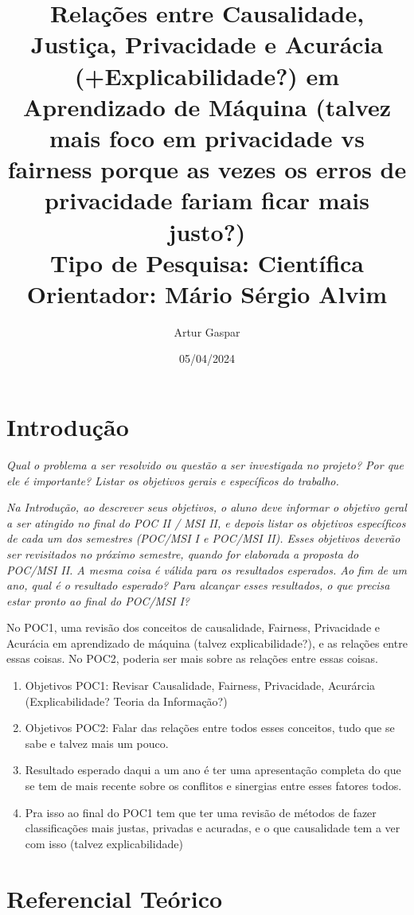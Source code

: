 \documentclass{article}
\title{Relações entre Causalidade, Justiça, Privacidade e Acurácia (+Explicabilidade?) em Aprendizado de Máquina (talvez mais foco em privacidade vs fairness porque as vezes os erros de privacidade fariam ficar mais justo?)\large\\ Tipo de Pesquisa: Científica\\Orientador: Mário Sérgio Alvim}
\author{Artur Gaspar}
\date{05/04/2024}
\begin{document}
\maketitle

\section{Introdução}

\textit{Qual o problema a ser resolvido ou questão a ser investigada no projeto? Por que ele é importante? Listar os objetivos gerais e específicos do trabalho.}

\textit{Na Introdução, ao descrever seus objetivos, o aluno deve informar o objetivo geral a ser atingido no final do POC II / MSI II, e depois listar os objetivos específicos de cada um dos semestres (POC/MSI I e POC/MSI II). Esses objetivos deverão ser revisitados no próximo semestre, quando for elaborada a proposta do POC/MSI II. A mesma coisa é válida para os resultados esperados. Ao fim de um ano, qual é o resultado esperado? Para alcançar esses resultados, o que precisa estar pronto ao final do POC/MSI I?}

No POC1, uma revisão dos conceitos de causalidade, Fairness, Privacidade e Acurácia em aprendizado de máquina (talvez explicabilidade?), e as relações entre essas coisas. No POC2, poderia ser mais sobre as relações entre essas coisas.

\begin{enumerate}
    \item Objetivos POC1: Revisar Causalidade, Fairness, Privacidade, Acurárcia (Explicabilidade? Teoria da Informação?)
    \item Objetivos POC2: Falar das relações entre todos esses conceitos, tudo que se sabe e talvez mais um pouco.
    \item Resultado esperado daqui a um ano é ter uma apresentação completa do que se tem de mais recente sobre os conflitos e sinergias entre esses fatores todos.
    \item Pra isso ao final do POC1 tem que ter uma revisão de métodos de fazer classificações mais justas, privadas e acuradas, e o que causalidade tem a ver com isso (talvez explicabilidade)
\end{enumerate}

\section{Referencial Teórico}
\end{document}
